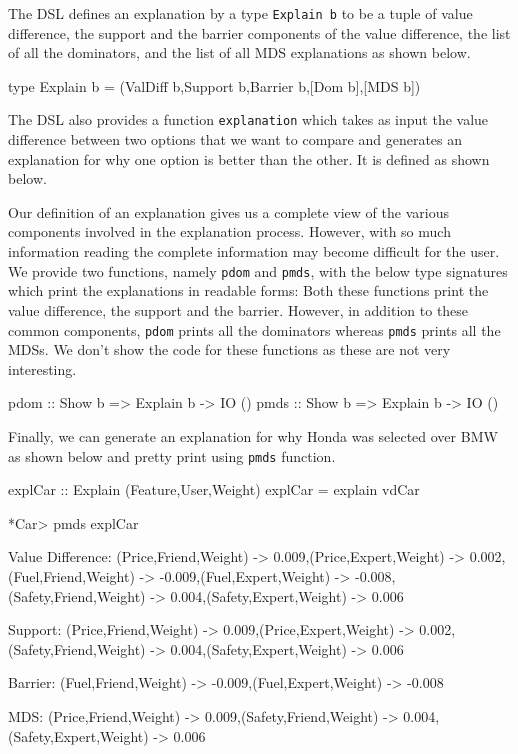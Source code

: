 \documentclass{jfp}
\newcommand{\prog}[1]{\texttt{#1}}
\begin{document}
The DSL defines an explanation by a type \prog{Explain b} to be a tuple of value difference, the support and the barrier components of the value difference, the list of all the dominators, and the list of all MDS explanations as shown below. 
\begin{haskellcode}
type Explain b = (ValDiff b,Support b,Barrier b,[Dom b],[MDS b])
\end{haskellcode}
The DSL also provides a function \prog{explanation} which takes as input the value difference between two options that we want to compare and generates an explanation for why one option is better than the other. It is defined as shown below. 
Our definition of an explanation gives us a complete view of the various components involved in the explanation process. However, with so much information reading the complete information may become difficult for the user. We provide two functions, namely \prog{pdom} and \prog{pmds}, with the below type signatures which print the explanations in readable forms: Both these functions print the value difference, the support and the barrier. However, in addition to these common components, \prog{pdom} prints all the dominators whereas \prog{pmds} prints all the MDSs. We don't show the code for these functions as these are not very interesting.
\begin{haskellcode}
pdom :: Show b => Explain b -> IO ()
pmds :: Show b => Explain b -> IO ()
\end{haskellcode}

Finally, we can generate an explanation for why Honda was selected over BMW as shown below and pretty print using \prog{pmds} function. 
\begin{haskellcode}
explCar :: Explain (Feature,User,Weight)
explCar = explain vdCar

*Car> pmds explCar

Value Difference: {(Price,Friend,Weight) -> 0.009,(Price,Expert,Weight) -> 0.002,
                  (Fuel,Friend,Weight) -> -0.009,(Fuel,Expert,Weight) -> -0.008,
                  (Safety,Friend,Weight) -> 0.004,(Safety,Expert,Weight) -> 0.006}

Support: {(Price,Friend,Weight) -> 0.009,(Price,Expert,Weight) -> 0.002,
          (Safety,Friend,Weight) -> 0.004,(Safety,Expert,Weight) -> 0.006}

Barrier: {(Fuel,Friend,Weight) -> -0.009,(Fuel,Expert,Weight) -> -0.008}

MDS: {(Price,Friend,Weight) -> 0.009,(Safety,Friend,Weight) -> 0.004,
      (Safety,Expert,Weight) -> 0.006}
\end{haskellcode}
\end{document}
